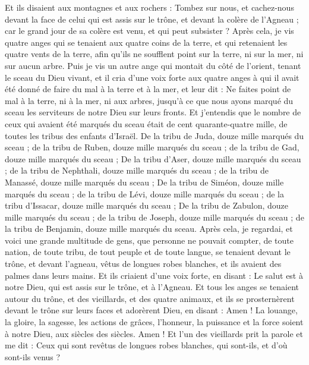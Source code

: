 \begin{multicols}{2}
Et ils disaient aux montagnes et aux rochers : Tombez sur nous, et cachez-nous devant la face de celui qui est assis sur le trône, et devant la colère de l'Agneau ;
car le grand jour de sa colère est venu, et qui peut subsister ?
\VerseOne{}Après cela, je vis quatre anges qui se tenaient aux quatre coins de la terre, et qui retenaient les quatre vents de la terre, afin qu'ils ne soufflent point sur la terre, ni sur la mer, ni sur aucun arbre.
Puis je vis un autre ange qui montait du côté de l'orient, tenant le sceau du Dieu vivant, et il cria d'une voix forte aux quatre anges à qui il avait été donné de faire du mal à la terre et à la mer,
et leur dit : Ne faites point de mal à la terre, ni à la mer, ni aux arbres, jusqu'à ce que nous ayons marqué du sceau les serviteurs de notre Dieu sur leurs fronts.
Et j'entendis que le nombre de ceux qui avaient été marqués du sceau était de cent quarante-quatre mille, de toutes les tribus des enfants d'Israël.
De la tribu de Juda, douze mille marqués du sceau ; de la tribu de Ruben, douze mille marqués du sceau ; de la tribu de Gad, douze mille marqués du sceau ;
De la tribu d'Aser, douze mille marqués du sceau ; de la tribu de Nephthali, douze mille marqués du sceau ; de la tribu de Manassé, douze mille marqués du sceau ;
De la tribu de Siméon, douze mille marqués du sceau ; de la tribu de Lévi, douze mille marqués du sceau ; de la tribu d'Issacar, douze mille marqués du sceau ;
De la tribu de Zabulon, douze mille marqués du sceau ; de la tribu de Joseph, douze mille marqués du sceau ; de la tribu de Benjamin, douze mille marqués du sceau.
Après cela, je regardai, et voici une grande multitude de gens, que personne ne pouvait compter, de toute nation, de toute tribu, de tout peuple et de toute langue, se tenaient devant le trône, et devant l'agneau, vêtus de longues robes blanches, et ils avaient des palmes dans leurs mains.
Et ils criaient d'une voix forte, en disant : Le salut est à notre Dieu, qui est assis sur le trône, et à l'Agneau.
Et tous les anges se tenaient autour du trône, et des vieillards, et des quatre animaux, et ils se prosternèrent devant le trône sur leurs faces et adorèrent Dieu,
en disant : Amen ! La louange, la gloire, la sagesse, les actions de grâces, l'honneur, la puissance et la force soient à notre Dieu, aux siècles des siècles. Amen !
Et l'un des vieillards prit la parole et me dit : Ceux qui sont revêtus de longues robes blanches, qui sont-ils, et d'où sont-ils venus ?

\end{multicols}
